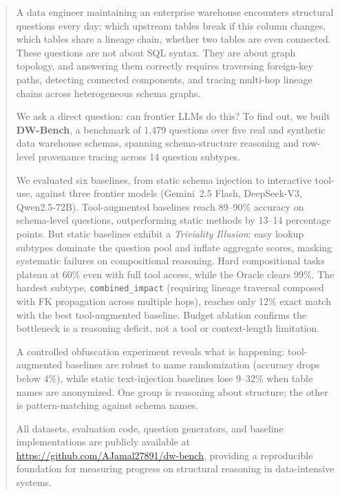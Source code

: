 \begin{abstract}
\noindent A data engineer maintaining an enterprise warehouse encounters
structural questions every day: which upstream tables break if this column
changes, which tables share a lineage chain, whether two tables are even
connected.  These questions are not about SQL syntax.  They are about
graph topology, and answering them correctly requires traversing
foreign-key paths, detecting connected components, and tracing
multi-hop lineage chains across heterogeneous schema graphs.

We ask a direct question: can frontier LLMs do this?  To find out, we
built \textbf{DW-Bench}, a benchmark of 1{,}479 questions over five real
and synthetic data warehouse schemas, spanning schema-structure reasoning
and row-level provenance tracing across 14 question subtypes.

We evaluated six baselines, from static schema injection to interactive
tool-use, against three frontier models (Gemini~2.5 Flash, DeepSeek-V3,
Qwen2.5-72B).
Tool-augmented baselines reach 89--90\% accuracy on schema-level
questions, outperforming static methods by 13--14 percentage points.
But static baselines exhibit a \textit{Triviality Illusion}: easy
lookup subtypes dominate the question pool and inflate aggregate scores,
masking systematic failures on compositional reasoning.
Hard compositional tasks plateau at 60\% even with full tool access,
while the Oracle clears 99\%.
The hardest subtype, \texttt{combined\_impact} (requiring lineage
traversal composed with FK propagation across multiple hops), reaches
only 12\% exact match with the best tool-augmented baseline.
Budget ablation confirms the bottleneck is a reasoning deficit,
not a tool or context-length limitation.

A controlled obfuscation experiment reveals what is happening:
tool-augmented baselines are robust to name randomization
(accuracy drops below 4\%), while static text-injection baselines
lose 9--32\% when table names are anonymized.
One group is reasoning about structure; the other is pattern-matching
against schema names.

All datasets, evaluation code, question generators, and baseline
implementations are publicly available at
\url{https://github.com/AJamal27891/dw-bench}, providing a reproducible
foundation for measuring progress on structural reasoning in
data-intensive systems.
\end{abstract}
